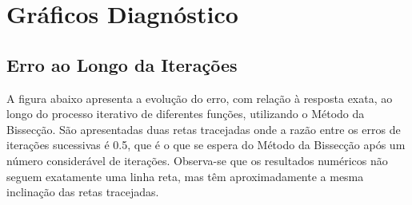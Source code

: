 \documentclass[final,3p,12pt]{elsarticle}
\begin{document}
 







\newpage

\appendix

\FloatBarrier
\section{Gráficos Diagnóstico}

\subsection{Erro ao Longo da Iterações}

A figura abaixo apresenta a evolução do erro, com relação à resposta exata, ao longo do processo iterativo de diferentes funções, utilizando o Método da Bissecção. São apresentadas duas retas tracejadas onde a razão entre os erros de iterações sucessivas é 0.5, que é o que se espera do Método da Bissecção após um número considerável de iterações. Observa-se que os resultados numéricos não seguem exatamente uma linha reta, mas têm aproximadamente a mesma inclinação das retas tracejadas.
\end{document}
